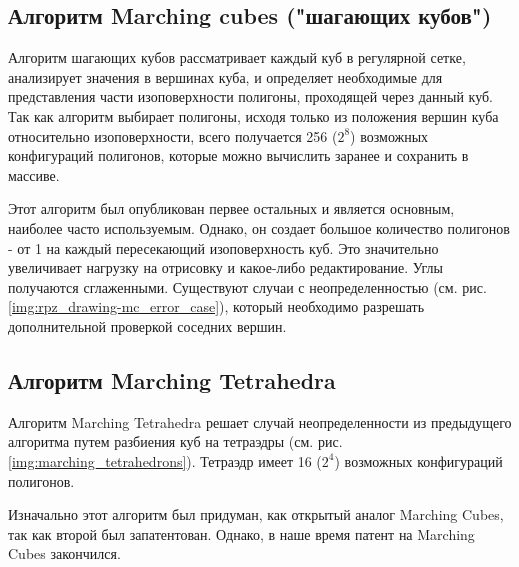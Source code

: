 
\subsection{Алгоритм Marching cubes ("шагающих кубов")}
Алгоритм шагающих кубов \cite{mc} рассматривает каждый куб в регулярной сетке, анализирует значения в вершинах куба, и определяет необходимые для представления части изоповерхности полигоны, проходящей через данный куб. Так как алгоритм выбирает полигоны, исходя только из положения вершин куба относительно изоповерхности, всего получается 256 ($2^8$) возможных конфигураций полигонов, которые можно вычислить заранее и сохранить в массиве.


Этот алгоритм был опубликован первее остальных и является основным, наиболее часто используемым. Однако, он создает большое количество полигонов - от 1 на каждый пересекающий изоповерхность куб. Это значительно увеличивает нагрузку на отрисовку и какое-либо редактирование. Углы получаются сглаженными. Существуют случаи с неопределенностью (см. рис. \ref{img:rpz_drawing-mc_error_case}), который необходимо разрешать дополнительной проверкой соседних вершин.


\subsection{Алгоритм Marching Tetrahedra}

Алгоритм Marching Tetrahedra\cite{marching_tetrahedra} решает случай неопределенности из предыдущего алгоритма путем разбиения куб на тетраэдры (см. рис. \ref{img:marching_tetrahedrons}). Тетраэдр имеет 16 ($2^4$) возможных конфигураций полигонов.

Изначально этот алгоритм был придуман, как открытый аналог Marching Cubes, так как второй был запатентован. Однако, в наше время патент на Marching Cubes закончился.


